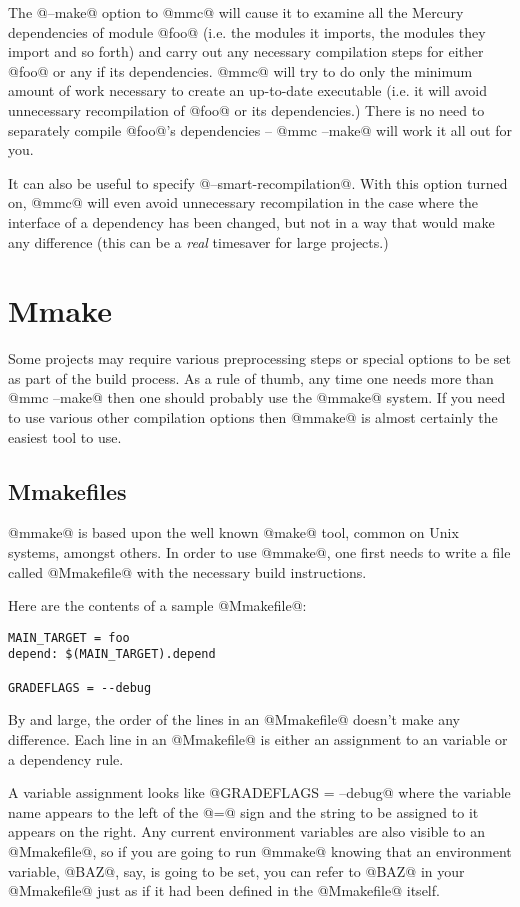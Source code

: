 The @--make@ option to @mmc@ will cause it to examine all the Mercury
dependencies of module @foo@ (i.e. the modules it imports, the modules
they import and so forth) and carry out any necessary compilation steps
for either @foo@ or any if its dependencies.  @mmc@ will try to do only
the minimum amount of work necessary to create an up-to-date executable
(i.e. it will avoid unnecessary recompilation of @foo@ or its
dependencies.)  There is no need to separately compile @foo@'s
dependencies -- @mmc --make@ will work it all out for you.

It can also be useful to specify @--smart-recompilation@.  With this
option turned on, @mmc@ will even avoid unnecessary
recompilation in the case where the interface of a dependency has
been changed, but not in a way that would make any difference (this
can be a \emph{real} timesaver for large projects.)

\section{Mmake}

Some projects may require various preprocessing steps or special options
to be set as part of the build process.  As a rule of thumb, any time
one needs more than @mmc --make@ then one should probably use the @mmake@
system.  If you need to use various other compilation options then @mmake@
is almost certainly the easiest tool to use.

\subsection{Mmakefiles}

@mmake@ is based upon the well known @make@ tool, common on Unix systems,
amongst others.  In order to use @mmake@, one first needs to write a
file called @Mmakefile@ with the necessary build instructions.

Here are the contents of a sample @Mmakefile@:
\begin{verbatim}
MAIN_TARGET = foo
depend: $(MAIN_TARGET).depend

GRADEFLAGS = --debug
\end{verbatim}
By and large, the order of the lines in an @Mmakefile@ doesn't make any
difference.  Each line in an @Mmakefile@ is either an assignment to an
variable or a dependency rule.

A variable assignment looks like @GRADEFLAGS = --debug@ where the variable
name appears to the left of the @=@ sign and the string to be assigned to
it appears on the right.  Any current environment variables are also
visible to an @Mmakefile@, so if you are going to run @mmake@ knowing that
an environment variable, @BAZ@, say, is going to be set, you can refer to
@BAZ@ in your @Mmakefile@ just as if it had been defined in the @Mmakefile@
itself.

